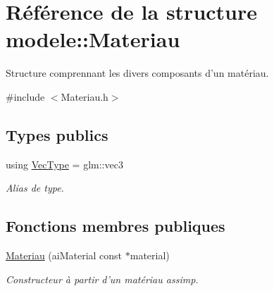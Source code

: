\hypertarget{structmodele_1_1_materiau}{\section{Référence de la structure modele\-:\-:Materiau}
\label{structmodele_1_1_materiau}
}


Structure comprennant les divers composants d'un matériau.  




{\ttfamily \#include $<$Materiau.\-h$>$}

\subsection*{Types publics}
\begin{DoxyCompactItemize}
\item 
\hypertarget{structmodele_1_1_materiau_a78b750424a82862ce601e47045027a88}{using \hyperlink{structmodele_1_1_materiau_a78b750424a82862ce601e47045027a88}{Vec\-Type} = glm\-::vec3}\label{structmodele_1_1_materiau_a78b750424a82862ce601e47045027a88}

\begin{DoxyCompactList}\small\item\em Alias de type. \end{DoxyCompactList}\end{DoxyCompactItemize}
\subsection*{Fonctions membres publiques}
\begin{DoxyCompactItemize}
\item 
\hyperlink{group__rendering_ga10d9cab94019fabdd02e8bfc85df772f}{Materiau} (ai\-Material const $\ast$material)
\begin{DoxyCompactList}\small\item\em Constructeur à partir d'un matériau assimp. \end{DoxyCompactList}\end{DoxyCompactItemize}
